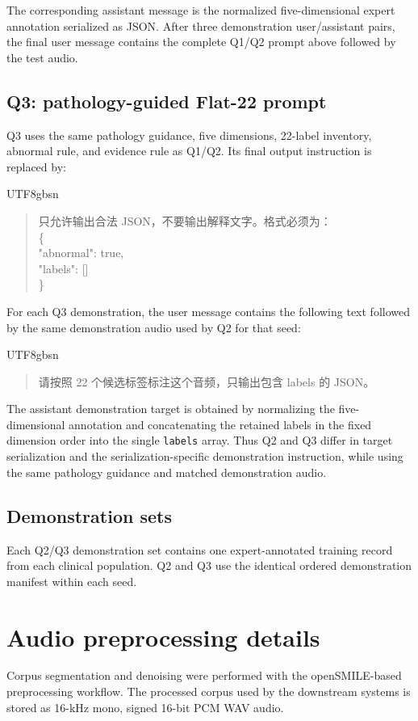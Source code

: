 \documentclass[10pt]{article}
\begin{document}
The corresponding assistant message is the normalized five-dimensional expert annotation serialized as JSON. After three demonstration user/assistant pairs, the final user message contains the complete Q1/Q2 prompt above followed by the test audio.

\subsection{Q3: pathology-guided Flat-22 prompt}
Q3 uses the same pathology guidance, five dimensions, 22-label inventory, abnormal rule, and evidence rule as Q1/Q2. Its final output instruction is replaced by:

\begin{CJK}{UTF8}{gbsn}
\begin{quote}\small
只允许输出合法 JSON，不要输出解释文字。格式必须为：\\
\{\\
\quad "abnormal": true,\\
\quad "labels": []\\
\}
\end{quote}
\end{CJK}

For each Q3 demonstration, the user message contains the following text followed by the same demonstration audio used by Q2 for that seed:

\begin{CJK}{UTF8}{gbsn}
\begin{quote}\small
请按照 22 个候选标签标注这个音频，只输出包含 labels 的 JSON。
\end{quote}
\end{CJK}

The assistant demonstration target is obtained by normalizing the five-dimensional annotation and concatenating the retained labels in the fixed dimension order into the single \texttt{labels} array. Thus Q2 and Q3 differ in target serialization and the serialization-specific demonstration instruction, while using the same pathology guidance and matched demonstration audio.

\subsection{Demonstration sets}
Each Q2/Q3 demonstration set contains one expert-annotated training record from each clinical population. Q2 and Q3 use the identical ordered demonstration manifest within each seed.

\section{Audio preprocessing details}
Corpus segmentation and denoising were performed with the openSMILE-based preprocessing workflow. The processed corpus used by the downstream systems is stored as 16-kHz mono, signed 16-bit PCM WAV audio.
\end{document}
